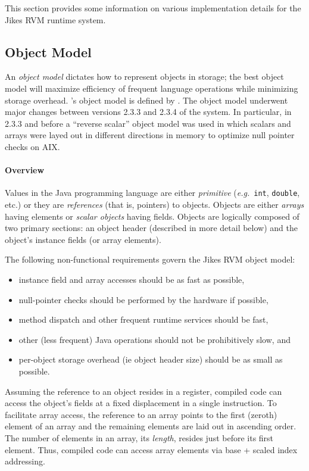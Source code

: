 This section provides some information on various
implementation details for the Jikes\TMweb{} RVM runtime system.

\subsection{Object Model}\label{sssec:objects}

An {\em object model} dictates how to represent objects in storage;
the best object model will maximize efficiency of frequent language
operations while minimizing storage overhead. \jrvm's
object model 
is defined by .
The \jrvm object model underwent major changes between versions
2.3.3 and 2.3.4 of the system.  In particular, in 2.3.3 and before a 
``reverse scalar'' object model was used in which scalars and arrays
were layed out in different directions in memory to optimize null
pointer checks on AIX. 

\paragraph{Overview}
Values in the Java\TMweb{} programming language are either {\em
primitive} ({\it e.g.}\ {\tt int}, {\tt double}, etc.)  or they are {\em
references} (that is, pointers) to objects.  Objects are either {\em
arrays} having elements or {\em scalar objects} having fields.
Objects are logically composed of two primary sections: an object
header (described in more detail below) and the object's instance
fields (or array elements). 

The following non-functional requirements govern the Jikes RVM object model:
\begin{itemize}
\item
instance field and array accesses should be as fast as possible,
\item
null-pointer checks should be performed by the hardware if possible, 
\item
method dispatch and other frequent runtime services should be fast,
\item
other (less frequent) Java operations should not be prohibitively
slow, and
\item
per-object storage overhead (ie object header size) should be as small
as possible.
\end{itemize}

Assuming the reference to an object resides in a register, compiled code can 
access the object's fields at a fixed displacement in a single
instruction.  To facilitate array access, the reference to an array
points to the first (zeroth) element of an array and the remaining
elements are laid out in ascending order.  The number of elements in
an array, its {\em length}, resides just before its first
element. Thus, compiled code can access array elements via base +
scaled index addressing.

